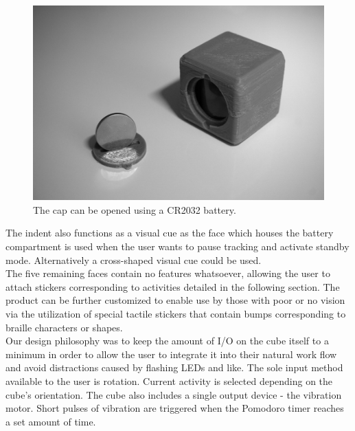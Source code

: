 \documentclass{article}
\begin{document}
\newpage

\begin{figure}[H]
\centering
\includegraphics[scale=1.6]{cube_overview.jpg}
\caption{The cap can be opened using a CR2032 battery.}
\label{fig:cap}
\end{figure}

The indent also functions as a visual cue as the face which houses the battery compartment is used when the user wants to pause tracking and activate standby mode. Alternatively a cross-shaped visual cue could be used.\\

The five remaining faces contain no features whatsoever, allowing the user to attach stickers corresponding to activities detailed in the following section. The product can be further customized to enable use by those with poor or no vision via the utilization of special tactile stickers that contain bumps corresponding to braille characters or shapes.\\

Our design philosophy was to keep the amount of I/O on the cube itself to a minimum in order to allow the user to integrate it into their natural work flow and avoid distractions caused by flashing LEDs and like. The sole input method available to the user is rotation. Current activity is selected depending on the cube's orientation. The cube also includes a single output device - the vibration motor. Short pulses of vibration are triggered when the Pomodoro timer reaches a set amount of time.

\newpage
\end{document}

